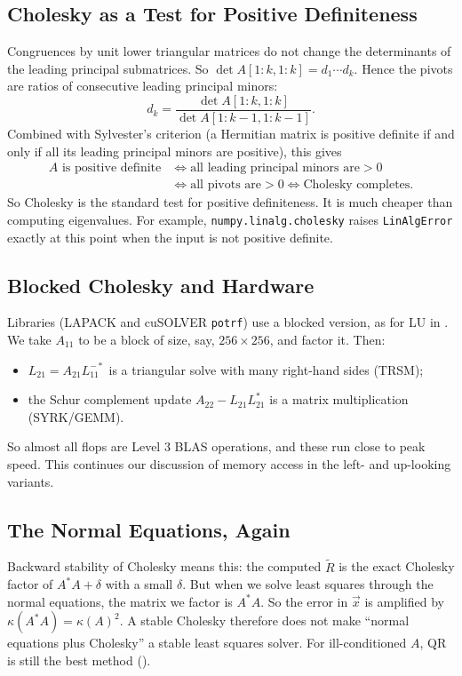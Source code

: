 \subsection{Cholesky as a Test for Positive Definiteness}

Congruences by unit lower triangular matrices do not change the determinants of the leading principal submatrices. So $\det A[1{:}k, 1{:}k] = d_1 \cdots d_k$. Hence the pivots are ratios of consecutive leading principal minors:
\begin{equation}
  d_k = \frac{\det A[1{:}k, 1{:}k]}{\det A[1{:}k-1, 1{:}k-1]}.
\end{equation}
Combined with Sylvester's criterion (a Hermitian matrix is positive definite if and only if all its leading principal minors are positive), this gives
\begin{equation}
  \begin{aligned}
    A \text{ is positive definite} &\iff \text{all leading principal minors are} > 0 \\
    &\iff \text{all pivots are} > 0 \iff \text{Cholesky completes}.
  \end{aligned}
\end{equation}
So Cholesky is the standard test for positive definiteness. It is much cheaper than computing eigenvalues. For example, \texttt{numpy.linalg.cholesky} raises \texttt{LinAlgError} exactly at this point when the input is not positive definite.

\subsection{Blocked Cholesky and Hardware}

Libraries (LAPACK and cuSOLVER \texttt{potrf}) use a blocked version, as for LU in . We take $A_{11}$ to be a block of size, say, $256 \times 256$, and factor it. Then:
\begin{itemize}
  \item $L_{21} = A_{21}L_{11}^{-\ast}$ is a triangular solve with many right-hand sides (TRSM);
  \item the Schur complement update $A_{22} - L_{21}L_{21}^\ast$ is a matrix multiplication (SYRK/GEMM).
\end{itemize}
So almost all flops are Level 3 BLAS operations, and these run close to peak speed. This continues our discussion of memory access in the left- and up-looking variants.

\subsection{The Normal Equations, Again}

Backward stability of Cholesky means this: the computed $\tilde{R}$ is the exact Cholesky factor of $A^\ast A + \delta$ with a small $\delta$. But when we solve least squares through the normal equations, the matrix we factor is $A^\ast A$. So the error in $\vec{x}$ is amplified by $\kappa(A^\ast A) = \kappa(A)^2$. A stable Cholesky therefore does not make ``normal equations plus Cholesky'' a stable least squares solver. For ill-conditioned $A$, QR is still the best method ().
